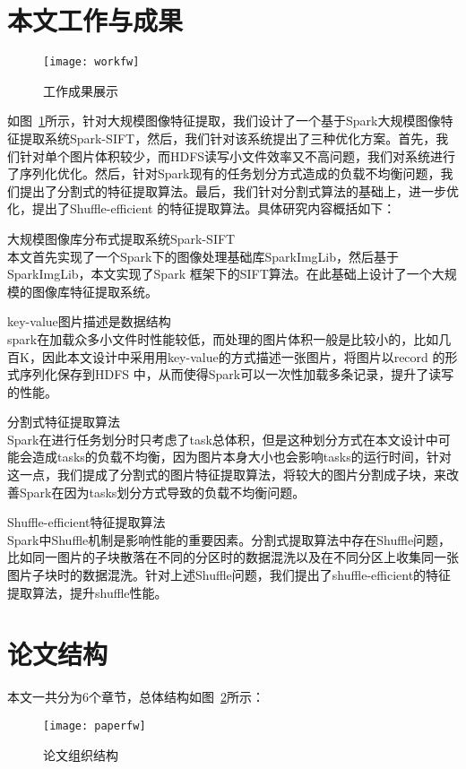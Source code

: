 \section{本文工作与成果}
\begin{figure}[htp]
\centering
\texttt{[image: workfw]}
\caption{工作成果展示}
\label{fig:workfw}
\end{figure}
如图~\ref{fig:workfw}所示，针对大规模图像特征提取，我们设计了一个基于Spark大规模图像特征提取系统Spark-SIFT，然后，我们针对该系统提出了三种优化方案。首先，我们针对单个图片体积较少，而HDFS读写小文件效率又不高问题，我们对系统进行了序列化优化。然后，针对Spark现有的任务划分方式造成的负载不均衡问题，我们提出了分割式的特征提取算法。最后，我们针对分割式算法的基础上，进一步优化，提出了Shuffle-efficient 的特征提取算法。具体研究内容概括如下：
\begin{compactenum}
\item 大规模图像库分布式提取系统Spark-SIFT\\本文首先实现了一个Spark下的图像处理基础库SparkImgLib，然后基于SparkImgLib，本文实现了Spark 框架下的SIFT算法。在此基础上设计了一个大规模的图像库特征提取系统。
\item key-value图片描述是数据结构\\spark在加载众多小文件时性能较低，而处理的图片体积一般是比较小的，比如几百K，因此本文设计中采用用key-value的方式描述一张图片，将图片以record 的形式序列化保存到HDFS 中，从而使得Spark可以一次性加载多条记录，提升了读写的性能。
\item 分割式特征提取算法\\Spark在进行任务划分时只考虑了task总体积，但是这种划分方式在本文设计中可能会造成tasks的负载不均衡，因为图片本身大小也会影响tasks的运行时间，针对这一点，我们提成了分割式的图片特征提取算法，将较大的图片分割成子块，来改善Spark在因为tasks划分方式导致的负载不均衡问题。
\item Shuffle-efficient特征提取算法\\Spark中Shuffle机制是影响性能的重要因素。分割式提取算法中存在Shuffle问题，比如同一图片的子块散落在不同的分区时的数据混洗以及在不同分区上收集同一张图片子块时的数据混洗。针对上述Shuffle问题，我们提出了shuffle-efficient的特征提取算法，提升shuffle性能。
\end{compactenum}

\section{论文结构}
本文一共分为6个章节，总体结构如图~\ref{fig:paperfw}所示：
\begin{figure}[htp]
\centering
\texttt{[image: paperfw]}
\caption{论文组织结构}
\label{fig:paperfw}
\end{figure}

